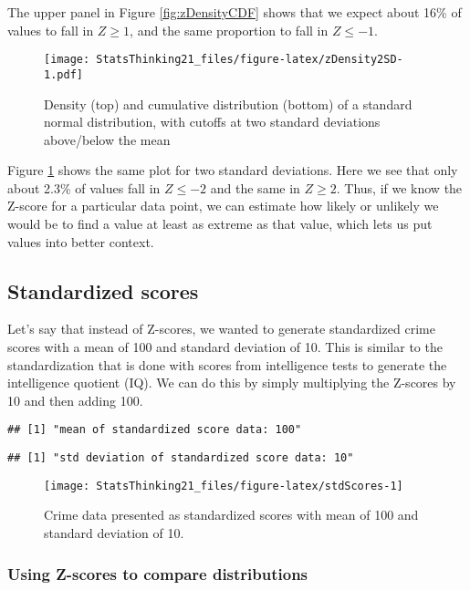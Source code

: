 \documentclass[]{book}
\theoremstyle{definition}
\theoremstyle{definition}
\theoremstyle{definition}
\theoremstyle{remark}
\begin{document}
The upper panel in Figure \ref{fig:zDensityCDF} shows that we expect
about 16\% of values to fall in \(Z\ge 1\), and the same proportion to
fall in \(Z\le -1\).

\begin{figure}
\centering
\texttt{[image: StatsThinking21\_files/figure-latex/zDensity2SD-1.pdf]}
\caption{\label{fig:zDensity2SD}Density (top) and cumulative distribution
(bottom) of a standard normal distribution, with cutoffs at two standard
deviations above/below the mean}
\end{figure}

Figure \ref{fig:zDensity2SD} shows the same plot for two standard
deviations. Here we see that only about 2.3\% of values fall in
\(Z \le -2\) and the same in \(Z \ge 2\). Thus, if we know the Z-score
for a particular data point, we can estimate how likely or unlikely we
would be to find a value at least as extreme as that value, which lets
us put values into better context.

\subsection{Standardized scores}\label{standardized-scores}

Let's say that instead of Z-scores, we wanted to generate standardized
crime scores with a mean of 100 and standard deviation of 10. This is
similar to the standardization that is done with scores from
intelligence tests to generate the intelligence quotient (IQ). We can do
this by simply multiplying the Z-scores by 10 and then adding 100.

\begin{verbatim}
## [1] "mean of standardized score data: 100"
\end{verbatim}

\begin{verbatim}
## [1] "std deviation of standardized score data: 10"
\end{verbatim}

\begin{figure}
\texttt{[image: StatsThinking21\_files/figure-latex/stdScores-1]} \caption{Crime data presented as standardized scores with mean of  100 and standard deviation of 10.}\label{fig:stdScores}
\end{figure}

\subsubsection{Using Z-scores to compare
distributions}\label{using-z-scores-to-compare-distributions}
\end{document}
